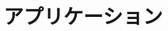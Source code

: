 \documentclass[main]{subfiles}
\begin{document}
\chapter{アプリケーション}
\fontsize{10.2}{10} \selectfont
\end{document}
